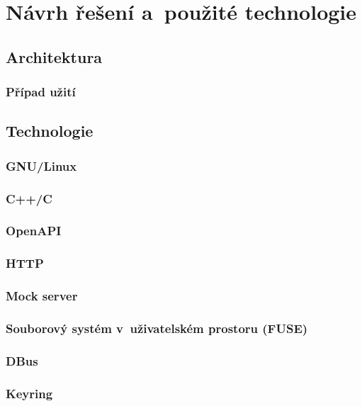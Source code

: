 \chapter{Návrh řešení a použité technologie}

\section{Architektura}
\subsection{Případ užití}

\section{Technologie}
\subsection{GNU/Linux}
\subsection{C++/C}
\subsection{OpenAPI}
\subsection{HTTP}

\cite{RFC7231}
\cite{HTTP3}

\subsection{Mock server}

\cite{MockServer}

\subsection{Souborový systém v uživatelském prostoru (FUSE)}

\cite{FuseOrNotToFuse}
\cite{HardeningFUSE}

\subsection{DBus}
\subsection{Keyring}

